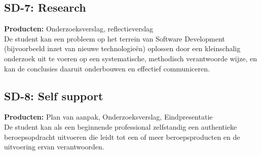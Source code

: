 \subsection{SD-7: Research}
\textbf{Producten:} Onderzoeksverslag, reflectieverslag \\
De student kan een probleem op het terrein van Software Development (bijvoorbeeld inzet van nieuwe technologieën) oplossen door een kleinschalig onderzoek uit te voeren op een systematische, methodisch verantwoorde wijze, en kan de conclusies daaruit onderbouwen en effectief communiceren.

\subsection{SD-8: Self support}
\textbf{Producten:} Plan van aanpak, Onderzoeksverslag, Eindpresentatie \\
De student kan als een beginnende professional zelfstandig een authentieke beroepsopdracht uitvoeren die leidt tot een of meer beroepsproducten en de uitvoering ervan verantwoorden.
